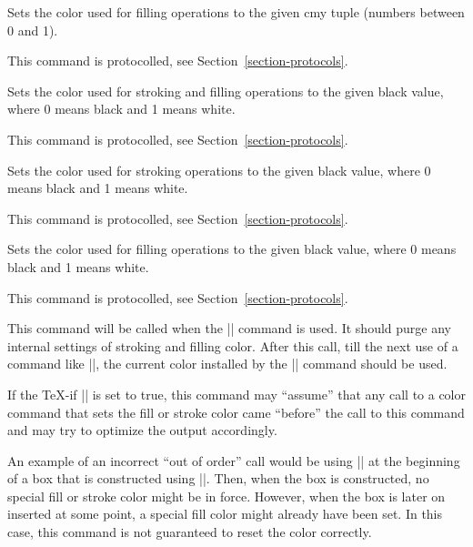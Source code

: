 \begin{command}{\pgfsys@color@cmy@fill{}}
  Sets the color used for filling operations to the given cmy tuple
  (numbers between 0 and 1).

  This command is protocolled, see Section~\ref{section-protocols}.
\end{command}

\begin{command}{\pgfsys@color@gray{}}
  Sets the color used for stroking and filling operations to the given
  black value, where 0 means black and 1 means white.

  This command is protocolled, see Section~\ref{section-protocols}.
\end{command}

\begin{command}{\pgfsys@color@gray@stroke{}}
  Sets the color used for stroking operations to the given black value,
  where 0 means black and 1 means white.

  This command is protocolled, see Section~\ref{section-protocols}.
\end{command}

\begin{command}{\pgfsys@color@gray@fill{}}
  Sets the color used for filling operations to the given black value,
  where 0 means black and 1 means white.

  This command is protocolled, see Section~\ref{section-protocols}.
\end{command}

\begin{command}{\pgfsys@color@reset}
  This command will be called when the |\color| command is used. It
  should purge any internal settings of stroking and filling
  color. After this call, till the next use of a command like
  |\pgfsys@color@rgb@fill|, the current color installed by the
  |\color| command should be used.

  If the \TeX-if |\pgfsys@color@reset@inorder| is set to true, this
  command may ``assume'' that any call to a color command that sets
  the fill or stroke color came ``before'' the call to this command
  and may try to optimize the output accordingly.

  An example of an incorrect ``out of order'' call would be using
  |\pgfsys@color@reset| at the beginning of a box that is constructed
  using |\setbox|. Then, when the box is constructed, no special fill
  or stroke color might be in force. However, when the box is later on
  inserted at some point, a special fill color might already have been
  set. In this case, this command is not guaranteed to reset the color
  correctly.
\end{command}


